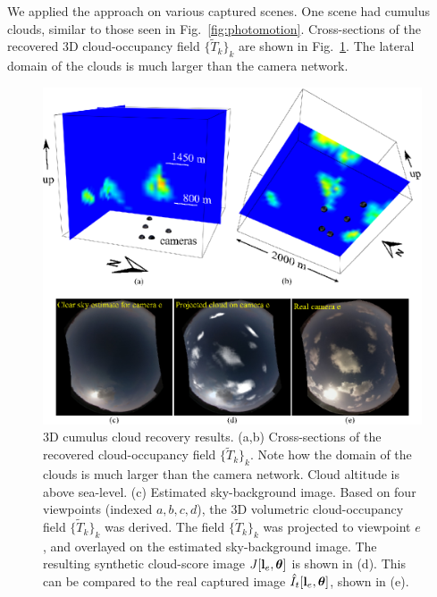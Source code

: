 \documentclass[runningheads]{llncs}
\begin{document}
We applied the approach on various captured scenes. One scene had cumulus clouds, similar to those seen in Fig.~\ref{fig:photomotion}.
%
%
Cross-sections of the recovered 3D cloud-occupancy field $\{\tilde T_k\}_k$ are shown in Fig.~\ref{fig:projection}. The lateral domain of the clouds is much larger than the camera network.
\begin{figure}[t!]
\begin{center}
   \includegraphics[width=1\linewidth]{figures/clouds_reconstructions.eps}
\end{center}
   \vspace{-0.6cm}
   \caption{3D cumulus cloud recovery results. (a,b) Cross-sections of the recovered cloud-occupancy field $\{\tilde T_k\}_k$. Note how the domain of the clouds is much larger than the camera network. Cloud
   altitude is above sea-level. (c) Estimated sky-background image.  Based on four viewpoints (indexed $a,b,c,d$), the 3D volumetric cloud-occupancy field $\{\tilde T_k\}_k$ was derived. The field $\{\tilde T_k\}_k$ was projected to viewpoint $e$, and overlayed on the estimated sky-background image. The resulting synthetic cloud-score image $J[{\bf l}_e,{\bm \theta}]$ is shown in (d). This can be compared to the real captured image $\hat I_t[{\bf l}_e,{\bm \theta}]$, shown in (e).}
\label{fig:projection}
\end{figure}
\end{document}
